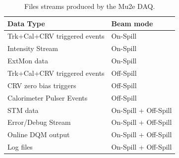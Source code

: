 \begin{table}[htb]
    \centering
    \begin{tabular}{|l|l|} \hline
Data Type                           & Beam mode \\ \hline
Trk+Cal+CRV triggered events        & On-Spill  \\
Intensity Stream                    & On-Spill  \\
ExtMon data           & On-Spill  \\
Trk+Cal+CRV triggered events        & Off-Spill \\
CRV zero bias triggers              & Off-Spill \\
Calorimeter Pulser Events           & Off-Spill \\ \hline
STM data              & On-Spill + Off-Spill \\ 
Error/Debug Stream                 & On-Spill + Off-Spill \\ \hline
Online DQM output                  & On-Spill + Off-Spill \\
Log files                          & On-Spill + Off-Spill \\ \hline
    \end{tabular}
    \caption{Files streams produced by the Mu2e DAQ.}
\label{tab:filestreams}
\end{table}

